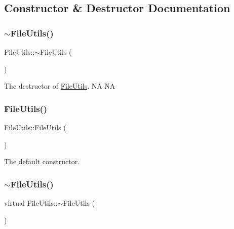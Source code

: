 \subsection{Constructor \& Destructor Documentation}
\mbox{\label{classFileUtils_a113a3a0ae84133a66408b20da027c0c7}} 
\subsubsection{\texorpdfstring{$\sim$\+File\+Utils()}{~FileUtils()}\hspace{0.1cm}{\footnotesize\ttfamily [1/2]}}
{\footnotesize\ttfamily File\+Utils\+::$\sim$\+File\+Utils (\begin{DoxyParamCaption}{ }\end{DoxyParamCaption})\hspace{0.3cm}{\ttfamily [virtual]}}

The destructor of \hyperlink{classFileUtils}{File\+Utils}.  NA  NA \mbox{\label{classFileUtils_abb87f1bbabb1164634e428aee3559b10}} 
\subsubsection{\texorpdfstring{File\+Utils()}{FileUtils()}\hspace{0.1cm}{\footnotesize\ttfamily [1/2]}}
{\footnotesize\ttfamily File\+Utils\+::\+File\+Utils (\begin{DoxyParamCaption}{ }\end{DoxyParamCaption})\hspace{0.3cm}{\ttfamily [protected]}}

The default constructor. \mbox{\label{classFileUtils_a5e36e104e5d2c7adf7b50dff0a75b437}} 
\subsubsection{\texorpdfstring{$\sim$\+File\+Utils()}{~FileUtils()}\hspace{0.1cm}{\footnotesize\ttfamily [2/2]}}
{\footnotesize\ttfamily virtual File\+Utils\+::$\sim$\+File\+Utils (\begin{DoxyParamCaption}{ }\end{DoxyParamCaption})\hspace{0.3cm}{\ttfamily [virtual]}}

